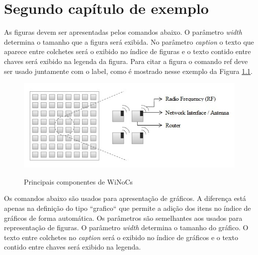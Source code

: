 \chapter{Segundo capítulo de exemplo}
\label{cap2}

\vspace{-1.9cm}

  
  As figuras devem ser apresentadas pelos comandos abaixo. O parâmetro \textit{width} determina o tamanho que a figura
  será exibida. No parâmetro \textit{caption} o texto que aparece entre colchetes será o exibido no índice de figuras e o texto
  contido entre chaves será exibido na legenda da figura. Para citar a figura o comando ref deve ser usado juntamente
  com o label, como é mostrado nesse exemplo da Figura \ref{fig:ComponentesWiNoC}.

  \begin{figure}[H]
  \setlength{\abovecaptionskip}{0pt}
  \setlength{\belowcaptionskip}{0pt}
  \caption[Principais componentes de WiNoCs]{Principais componentes de WiNoCs}
  \centering
  \includegraphics[width=.85\textwidth]{imagem/winoc.jpg}
  \captionsetup{justification=centering}
  \label{fig:ComponentesWiNoC}
  \end{figure}


  Os comandos abaixo são usados para apresentação de gráficos. A diferença está apenas na definição do tipo ``grafico`` 
  que permite a adição dos itens no índice de gráficos de forma automática. Os parâmetros são semelhantes aos usados para
  representação de figuras. O parâmetro \textit{width} determina o tamanho do gráfico. O texto entre colchetes 
  no \textit{caption} será o exibido no índice de gráficos e o texto contido entre chaves será exibido na legenda.

